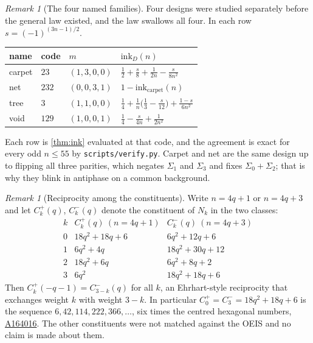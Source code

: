 \documentclass[11pt]{amsart}
\theoremstyle{definition}
\theoremstyle{remark}
\newtheorem{remark}[theorem]{Remark}
\begin{document}
\begin{remark}[The four named families]
\label{rem:families}
Four designs were studied separately before the general law existed, and the law swallows all four. In each row $s = (-1)^{(3n-1)/2}$.
\begin{center}
\begin{tabular}{llll}
\toprule
name & code & $m$ & $\mathrm{ink}_D(n)$ \\
\midrule
carpet & $23$ & $(1,3,0,0)$ & $\tfrac12 + \tfrac{s}{8} + \tfrac{1}{2n} - \tfrac{s}{8n^2}$ \\
net & $232$ & $(0,0,3,1)$ & $1 - \mathrm{ink}_{\mathrm{carpet}}(n)$ \\
tree & $3$ & $(1,1,0,0)$ & $\tfrac14 + \tfrac{1}{n}\bigl(\tfrac13 - \tfrac{s}{12}\bigr) + \tfrac{1-s}{6n^2}$ \\
void & $129$ & $(1,0,0,1)$ & $\tfrac14 - \tfrac{s}{4n} + \tfrac{1}{2n^2}$ \\
\bottomrule
\end{tabular}
\end{center}
Each row is \cref{thm:ink} evaluated at that code, and the agreement is exact for every odd $n \le 55$ by \texttt{scripts/verify.py}. Carpet and net are the same design up to flipping all three parities, which negates $\Sigma_1$ and $\Sigma_3$ and fixes $\Sigma_0 + \Sigma_2$; that is why they blink in antiphase on a common background.
\end{remark}

\begin{remark}[Reciprocity among the constituents]
\label{rem:recip}
Write $n = 4q+1$ or $n = 4q+3$ and let $C^{+}_k(q)$, $C^{-}_k(q)$ denote the constituent of $N_k$ in the two classes:
\[
\begin{array}{c|cc}
 k & C^{+}_k(q)\ (n = 4q+1) & C^{-}_k(q)\ (n = 4q+3)\\ \hline
0 & 18q^2+18q+6 & 6q^2+12q+6\\
1 & 6q^2+4q & 18q^2+30q+12\\
2 & 18q^2+6q & 6q^2+8q+2\\
3 & 6q^2 & 18q^2+18q+6
\end{array}
\]
Then $C^{+}_k(-q-1) = C^{-}_{3-k}(q)$ for all $k$, an Ehrhart-style reciprocity that exchanges weight $k$ with weight $3-k$. In particular $C^{+}_0 = C^{-}_3 = 18q^2+18q+6$ is the sequence $6, 42, 114, 222, 366, \dots$, six times the centred hexagonal numbers, \href{https://oeis.org/A164016}{A164016}. The other constituents were not matched against the OEIS and no claim is made about them.
\end{remark}
\end{document}
